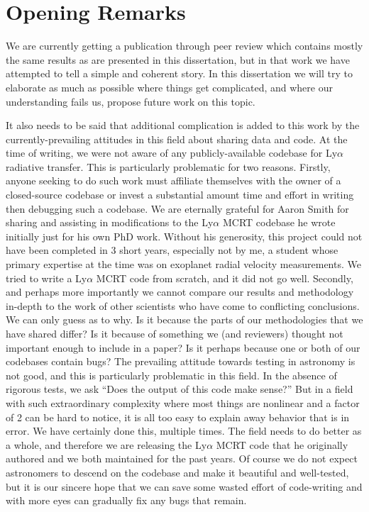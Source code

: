 \section{Opening Remarks}
We are currently getting a publication through peer review which contains mostly the same results as are presented in this dissertation, but in that work we have attempted to tell a simple and coherent story.
In this dissertation we will try to elaborate as much as possible where things get complicated, and where our understanding fails us, propose future work on this topic.

It also needs to be said that additional complication is added to this work by the currently-prevailing attitudes in this field about sharing data and code.
At the time of writing, we were not aware of any publicly-available codebase for Ly$\alpha$ radiative transfer.
This is particularly problematic for two reasons.
Firstly, anyone seeking to do such work must affiliate themselves with the owner of a closed-source codebase or invest a substantial amount time and effort in writing then debugging such a codebase.
We are eternally grateful for Aaron Smith for sharing and assisting in modifications to the Ly$\alpha$ MCRT codebase he wrote initially just for his own PhD work.
Without his generosity, this project could not have been completed in 3 short years, especially not by me, a student whose primary expertise at the time was on exoplanet radial velocity measurements.
We tried to write a Ly$\alpha$ MCRT code from scratch, and it did not go well.
Secondly, and perhaps more importantly we cannot compare our results and methodology in-depth to the work of other scientists who have come to conflicting conclusions.
We can only guess as to why.
Is it because the parts of our methodologies that we have shared differ?
Is it because of something we (and reviewers) thought not important enough to include in a paper?
Is it perhaps because one or both of our codebases contain bugs?
The prevailing attitude towards testing in astronomy is not good, and this is particularly problematic in this field.
In the absence of rigorous tests, we ask ``Does the output of this code make sense?''
But in a field with such extraordinary complexity where most things are nonlinear and a factor of 2 can be hard to notice, it is all too easy to explain away behavior that is in error.
We have certainly done this, multiple times.
The field needs to do better as a whole, and therefore we are releasing the Ly$\alpha$ MCRT code that he originally authored and we both maintained for the past years.
Of course we do not expect astronomers to descend on the codebase and make it beautiful and well-tested, but it is our sincere hope that we can save some wasted effort of code-writing and with more eyes can gradually fix any bugs that remain.

